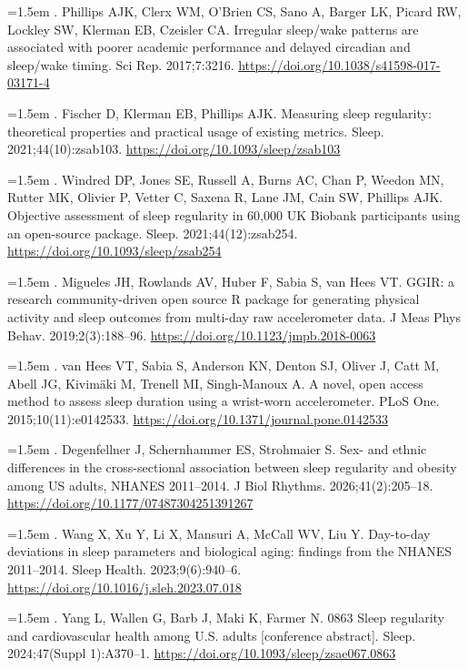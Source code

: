 \documentclass[12pt]{article}
\begin{document}
\begin{sloppypar}
\setlength{\parindent}{0pt}
\raggedright
\hangindent=1.5em  . Phillips AJK, Clerx WM, O'Brien CS, Sano A, Barger LK, Picard RW, Lockley SW, Klerman EB, Czeisler CA. Irregular sleep/wake patterns are associated with poorer academic performance and delayed circadian and sleep/wake timing. Sci Rep. 2017;7:3216. \url{https://doi.org/10.1038/s41598-017-03171-4}

\hangindent=1.5em  . Fischer D, Klerman EB, Phillips AJK. Measuring sleep regularity: theoretical properties and practical usage of existing metrics. Sleep. 2021;44(10):zsab103. \url{https://doi.org/10.1093/sleep/zsab103}

\hangindent=1.5em  . Windred DP, Jones SE, Russell A, Burns AC, Chan P, Weedon MN, Rutter MK, Olivier P, Vetter C, Saxena R, Lane JM, Cain SW, Phillips AJK. Objective assessment of sleep regularity in 60,000 UK Biobank participants using an open-source package. Sleep. 2021;44(12):zsab254. \url{https://doi.org/10.1093/sleep/zsab254}

\hangindent=1.5em  . Migueles JH, Rowlands AV, Huber F, Sabia S, van Hees VT. GGIR: a research community-driven open source R package for generating physical activity and sleep outcomes from multi-day raw accelerometer data. J Meas Phys Behav. 2019;2(3):188--96. \url{https://doi.org/10.1123/jmpb.2018-0063}

\hangindent=1.5em  . van Hees VT, Sabia S, Anderson KN, Denton SJ, Oliver J, Catt M, Abell JG, Kivim\"aki M, Trenell MI, Singh-Manoux A. A novel, open access method to assess sleep duration using a wrist-worn accelerometer. PLoS One. 2015;10(11):e0142533. \url{https://doi.org/10.1371/journal.pone.0142533}

\hangindent=1.5em  . Degenfellner J, Schernhammer ES, Strohmaier S. Sex- and ethnic differences in the cross-sectional association between sleep regularity and obesity among US adults, NHANES 2011--2014. J Biol Rhythms. 2026;41(2):205--18. \url{https://doi.org/10.1177/07487304251391267}

\hangindent=1.5em  . Wang X, Xu Y, Li X, Mansuri A, McCall WV, Liu Y. Day-to-day deviations in sleep parameters and biological aging: findings from the NHANES 2011--2014. Sleep Health. 2023;9(6):940--6. \url{https://doi.org/10.1016/j.sleh.2023.07.018}

\hangindent=1.5em  . Yang L, Wallen G, Barb J, Maki K, Farmer N. 0863 Sleep regularity and cardiovascular health among U.S. adults [conference abstract]. Sleep. 2024;47(Suppl 1):A370--1. \url{https://doi.org/10.1093/sleep/zsae067.0863}


\end{sloppypar}
\end{document}
